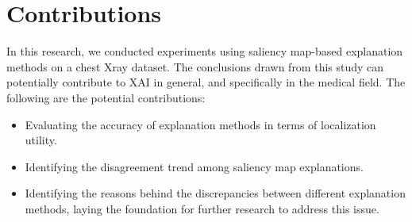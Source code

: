 \section{Contributions}
\label{sec:contributions}
In this research, we conducted experiments using saliency map-based explanation methods on a chest Xray dataset. The conclusions drawn from this study can potentially contribute to XAI in general, and specifically in the medical field. The following are the potential contributions:
\begin{itemize}
    \item Evaluating the accuracy of explanation methods in terms of localization utility.
    \item Identifying the disagreement trend among saliency map explanations.
    \item Identifying the reasons behind the discrepancies between different explanation methods, laying the foundation for further research to address this issue.
\end{itemize}